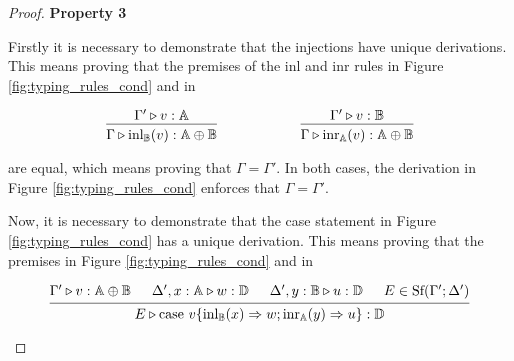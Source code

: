 \documentclass[10pt,a4paper]{amsart}
\theoremstyle{definition}
\theoremstyle{definition}
\theoremstyle{definition}
\theoremstyle{definition}
\theoremstyle{definition}
\theoremstyle{definition}
\begin{document}
\begin{proof}
\vspace{10pt}
    \textbf{Property 3}

    Firstly it is necessary to demonstrate that the injections have unique derivations. This means proving that the premises of the inl and inr rules in Figure \ref{fig:typing_rules_cond} and in
\begin{figure} [H]
  \begin{equation*}
  \begin{aligned}
    &
    \begin{prooftree}
    \hypo{\Gamma' \triangleright v: \mathbb{A}}
    \infer1[]{\Gamma \triangleright \text{inl}_{\mathbb{B}}(v): \mathbb{A} \oplus \mathbb{B}}
    \end{prooftree}
    \hspace{60pt}
    \begin{prooftree}
    \hypo{\Gamma' \triangleright v: \mathbb{B}}
    \infer1[]{\Gamma \triangleright \text{inr}_{\mathbb{A}}(v): \mathbb{A} \oplus \mathbb{B}}
    \end{prooftree} \\
  \end{aligned}
  \end{equation*}
  \end{figure}

are equal, which means proving that $\Gamma = \Gamma'$. In both cases, the derivation in Figure \ref{fig:typing_rules_cond} enforces that $\Gamma = \Gamma'$.

Now, it is necessary to demonstrate that the case statement in Figure \ref{fig:typing_rules_cond} has a unique derivation. This means proving that the premises in Figure \ref{fig:typing_rules_cond} and in

\begin{figure} [H]
  \begin{equation*}
  \begin{aligned}
    \begin{prooftree}
        \hypo{\Gamma' \triangleright v: \mathbb{A} \oplus \mathbb{B}}
        \hypo{\Delta', x: \mathbb{A} \triangleright w: \mathbb{D}}
        \hypo{\Delta', y: \mathbb{B} \triangleright u: \mathbb{D}}
        \hypo{E \in \text{Sf}(\Gamma'; \Delta')}
        \infer4[]{E \triangleright \text{case } v \{\text{inl}_{\mathbb{B}}(x) \Rightarrow w ; \text{inr}_{\mathbb{A}}(y) \Rightarrow u\}: \mathbb{D}}
        \end{prooftree}
  \end{aligned}
  \end{equation*}
  \end{figure}


\end{proof}
\end{document}
